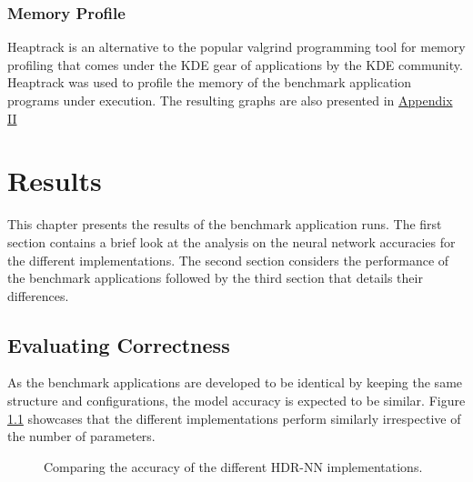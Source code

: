 \subsection{Memory Profile}

Heaptrack is an alternative to the popular valgrind programming tool for memory profiling that comes under the KDE gear of applications by the KDE community. Heaptrack was used to profile the memory of the benchmark application programs under execution. The resulting graphs are also presented in \hyperref[hdrnn-memory-profile]{Appendix II}



\chapter{Results}

This chapter presents the results of the benchmark application runs. The first section contains a brief look at the analysis on the neural network accuracies for the different implementations. The second section considers the performance of the benchmark applications followed by the third section that details their differences.


\section{Evaluating Correctness}

As the benchmark applications are developed to be identical by keeping the same structure and configurations, the model accuracy is expected to be similar. Figure \ref{hdrnn-accuracy} showcases that the different implementations perform similarly irrespective of the number of parameters.

\begin{figure}[!ht]
	\centering
	
	\caption[HDR-NN Accuracy]{Comparing the accuracy of the different HDR-NN implementations.}
	\label{hdrnn-accuracy}
\end{figure}

